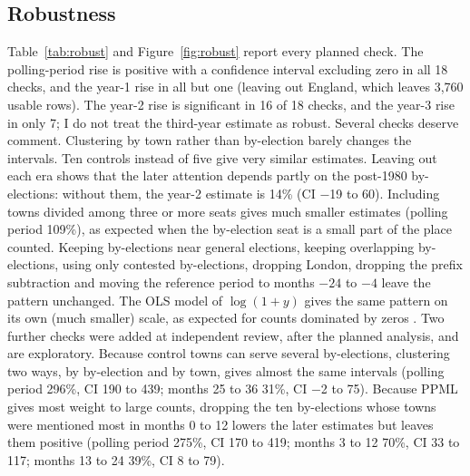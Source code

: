 \documentclass[11pt,a4paper]{article}
\begin{document}
\subsection{Robustness}
Table~\ref{tab:robust} and Figure~\ref{fig:robust} report every planned check. The polling-period rise is positive with a confidence interval excluding zero in all 18 checks, and the year-1 rise in all but one (leaving out England, which leaves 3,760 usable rows). The year-2 rise is significant in 16 of 18 checks, and the year-3 rise in only 7; I do not treat the third-year estimate as robust. Several checks deserve comment. Clustering by town rather than by-election barely changes the intervals. Ten controls instead of five give very similar estimates. Leaving out each era shows that the later attention depends partly on the post-1980 by-elections: without them, the year-2 estimate is 14\% (CI $-$19 to 60). Including towns divided among three or more seats gives much smaller estimates (polling period 109\%), as expected when the by-election seat is a small part of the place counted. Keeping by-elections near general elections, keeping overlapping by-elections, using only contested by-elections, dropping London, dropping the prefix subtraction and moving the reference period to months $-24$ to $-4$ leave the pattern unchanged. The OLS model of $\log(1+y)$ gives the same pattern on its own (much smaller) scale, as expected for counts dominated by zeros \citep{santos2006}. Two further checks were added at independent review, after the planned analysis, and are exploratory. Because control towns can serve several by-elections, clustering two ways, by by-election and by town, gives almost the same intervals (polling period 296\%, CI 190 to 439; months 25 to 36 31\%, CI $-$2 to 75). Because PPML gives most weight to large counts, dropping the ten by-elections whose towns were mentioned most in months 0 to 12 lowers the later estimates but leaves them positive (polling period 275\%, CI 170 to 419; months 3 to 12 70\%, CI 33 to 117; months 13 to 24 39\%, CI 8 to 79).
\end{document}
